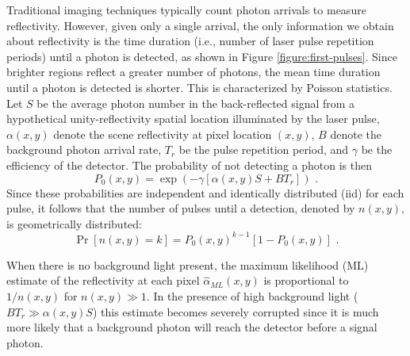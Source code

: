 Traditional imaging techniques typically count photon arrivals to measure reflectivity. However, given only a single arrival, the only information we obtain about reflectivity is the time duration (i.e., number of laser pulse repetition periods) until a photon is detected, as shown in Figure \ref{figure:first-pulses}. Since brighter regions reflect a greater number of photons, the mean time duration until a photon is detected is shorter. This is characterized by Poisson statistics. Let $S$ be the average photon number in the back-reflected signal from a hypothetical unity-reflectivity spatial location illuminated by the laser pulse, $\alpha(x,y)$ denote the scene reflectivity at pixel location $(x,y)$, $B$ denote the background photon arrival rate, $T_r$ be the pulse repetition period, and $\gamma$ be the efficiency of the detector. The probability of not detecting a photon is then
\begin{equation}
P_0(x, y) = \exp\left(-\gamma[\alpha(x,y)S + BT_r]\right)\,\,.
\label{equation:first-probdetect}
\end{equation}
Since these probabilities are independent and identically distributed (iid) for each pulse, it follows that the number of pulses until a detection, denoted by $n(x, y)$, is geometrically distributed:
\begin{equation}
\operatorname{Pr}\left[n(x,y) = k \right] = P_0(x,y)^{k-1} \left[ 1 - P_0(x,y) \right]\,\,.
\label{equation:first-geometric}
\end{equation}

When there is no background light present, the maximum likelihood (ML) estimate of the reflectivity at each pixel $\hat{\alpha}_{ML}(x,y)$ is proportional to $1/n(x,y)$ for $n(x,y) \gg 1$. In the presence of high background light ($B T_r \gg \alpha(x,y) S$) this estimate becomes severely corrupted since it is much more likely that a background photon will reach the detector before a signal photon.

